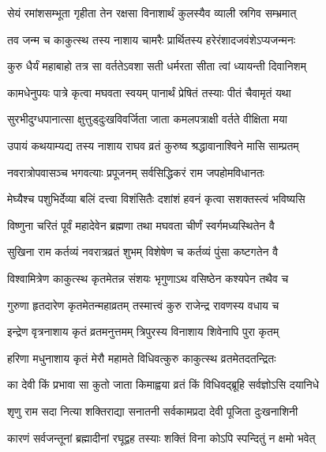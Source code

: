 \twolineshloka
{सेयं रमांशसम्भूता गृहीता तेन रक्षसा}
{विनाशार्थं कुलस्यैव व्याली स्रगिव सम्भ्रमात्}%

\twolineshloka
{तव जन्म च काकुत्स्थ तस्य नाशाय चामरैः}
{प्रार्थितस्य हरेरंशादजवंशेऽप्यजन्मनः}%

\twolineshloka
{कुरु धैर्यं महाबाहो तत्र सा वर्ततेऽवशा}
{सती धर्मरता सीता त्वां ध्यायन्ती दिवानिशम्}%

\twolineshloka
{कामधेनुपयः पात्रे कृत्वा मघवता स्वयम्}
{पानार्थं प्रेषितं तस्याः पीतं चैवामृतं यथा}%

\twolineshloka
{सुरभीदुग्धपानात्सा क्षुत्तुड्‌दुःखविवर्जिता}
{जाता कमलपत्राक्षी वर्तते वीक्षिता मया}%

\twolineshloka
{उपायं कथयाम्यद्य तस्य नाशाय राघव}
{व्रतं कुरुष्व श्रद्धावानाश्विने मासि साम्प्रतम्}%

\twolineshloka
{नवरात्रोपवासञ्च भगवत्याः प्रपूजनम्}
{सर्वसिद्धिकरं राम जपहोमविधानतः}%

\twolineshloka
{मेघ्यैश्च पशुभिर्देव्या बलिं दत्त्वा विशंसितैः}
{दशांशं हवनं कृत्वा सशक्तस्त्वं भविष्यसि}%

\twolineshloka
{विष्णुना चरितं पूर्वं महादेवेन ब्रह्मणा}
{तथा मघवता चीर्णं स्वर्गमध्यस्थितेन वै}%

\twolineshloka
{सुखिना राम कर्तव्यं नवरात्रव्रतं शुभम्}
{विशेषेण च कर्तव्यं पुंसा कष्टगतेन वै}%

\twolineshloka
{विश्वामित्रेण काकुत्स्थ कृतमेतन्न संशयः}
{भृगुणाऽथ वसिष्ठेन कश्यपेन तथैव च}%

\twolineshloka
{गुरुणा हृतदारेण कृतमेतन्महाव्रतम्}
{तस्मात्त्वं कुरु राजेन्द्र रावणस्य वधाय च}%

\twolineshloka
{इन्द्रेण वृत्रनाशाय कृतं व्रतमनुत्तमम्}
{त्रिपुरस्य विनाशाय शिवेनापि पुरा कृतम्}%

\twolineshloka
{हरिणा मधुनाशाय कृतं मेरौ महामते}
{विधिवत्कुरु काकुत्स्थ व्रतमेतदतन्द्रितः}%



\twolineshloka
{का देवी किं प्रभावा सा कुतो जाता किमाह्वया}
{व्रतं किं विधिवद्‌ब्रूहि सर्वज्ञोऽसि दयानिधे}%



\twolineshloka
{शृणु राम सदा नित्या शक्तिराद्या सनातनी}
{सर्वकामप्रदा देवी पूजिता दुःखनाशिनी}%

\twolineshloka
{कारणं सर्वजन्तूनां ब्रह्मादीनां रघूद्वह}
{तस्याः शक्तिं विना कोऽपि स्पन्दितुं न क्षमो भवेत्}%

